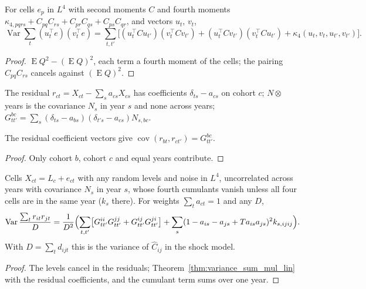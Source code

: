 \begin{theorem}\label{thm:variance_sum_mul_lin}
  \leanok
  For cells $e_p$ in $L^4$ with second moments $C$ and fourth moments
  $\kappa_{4,pqrs} + C_{pq}C_{rs} + C_{pr}C_{qs} + C_{ps}C_{qr}$, and vectors $u_t$, $v_t$,
  \[ \operatorname{Var}\sum_t(u_t^\top e)(v_t^\top e) = \sum_{t,t'}\bigl[(u_t^\top Cu_{t'})(v_t^\top Cv_{t'})
     + (u_t^\top Cv_{t'})(v_t^\top Cu_{t'}) + \kappa_4(u_t, v_t, u_{t'}, v_{t'})\bigr]. \]
\end{theorem}
\begin{proof}
  \leanok
  $\operatorname{E}Q^2 - (\operatorname{E}Q)^2$, each term a fourth moment of the cells; the pairing
  $C_{pq}C_{rs}$ cancels against $(\operatorname{E}Q)^2$.
\end{proof}

\begin{definition}\label{def:resCross}
  \leanok
  The residual $r_{ct} = X_{ct} - \sum_sa_{cs}X_{cs}$ has coefficients $\delta_{ts} - a_{cs}$ on
  cohort $c$; $N\otimes$ years is the covariance $N_s$ in year $s$ and none across years;
  $G^{bc}_{tt'} = \sum_s(\delta_{ts} - a_{bs})(\delta_{t's} - a_{cs})N_{s,bc}$.
\end{definition}

\begin{lemma}\label{lem:resCoef_dot}
  \leanok
  The residual coefficient vectors give $\operatorname{cov}(r_{bt}, r_{ct'}) = G^{bc}_{tt'}$.
\end{lemma}
\begin{proof}
  \leanok
  Only cohort $b$, cohort $c$ and equal years contribute.
\end{proof}

\begin{theorem}\label{thm:variance_crossResid}
  \leanok
  Cells $X_{ct} = L_c + e_{ct}$ with any random levels and noise in $L^4$, uncorrelated across
  years with covariance $N_s$ in year $s$, whose fourth cumulants vanish unless all four cells are
  in the same year ($k_s$ there). For weights $\sum_ta_{ct} = 1$ and any $D$,
  \[ \operatorname{Var}\frac{\sum_tr_{it}r_{jt}}{D} = \frac{1}{D^2}\Bigl(\sum_{t,t'}\bigl[G^{ii}_{tt'}G^{jj}_{tt'}
     + G^{ij}_{tt'}G^{ji}_{tt'}\bigr] + \sum_s(1 - a_{is} - a_{js} + Ta_{is}a_{js})^2k_{s,ijij}\Bigr). \]
  With $D = \sum_td_{ijt}$ this is the variance of $\hat C_{ij}$ in the shock model.
\end{theorem}
\begin{proof}
  \leanok
  The levels cancel in the residuals; Theorem~\ref{thm:variance_sum_mul_lin} with the residual
  coefficients, and the cumulant term sums over one year.
\end{proof}

